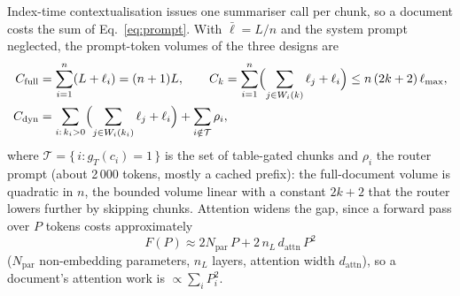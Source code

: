 \documentclass[pdflatex,sn-mathphys-num]{sn-jnl}
\theoremstyle{thmstyleone}%
\theoremstyle{thmstylethree}%
\begin{document}
Index-time contextualisation issues one summariser call per chunk, so a document costs the sum of Eq.~\eqref{eq:prompt}. With $\bar\ell=L/n$ and the system prompt neglected, the prompt-token volumes of the three designs are
\begin{align}
C_{\mathrm{full}}&=\sum_{i=1}^{n}(L+\ell_i)=(n+1)L,\qquad
C_{k}=\sum_{i=1}^{n}\Bigl(\sum_{j\in W_i(k)}\ell_j+\ell_i\Bigr)\le n\,(2k+2)\,\ell_{\max},\nonumber\\
C_{\mathrm{dyn}}&=\sum_{i:\,k_i>0}\Bigl(\sum_{j\in W_i(k_i)}\ell_j+\ell_i\Bigr)+\sum_{i\notin\mathcal T}\rho_i,\label{eq:volume}
\end{align}
where $\mathcal T=\{\,i: g_T(c_i)=1\,\}$ is the set of table-gated chunks and $\rho_i$ the router prompt (about 2\,000 tokens, mostly a cached prefix): the full-document volume is quadratic in $n$, the bounded volume linear with a constant $2k+2$ that the router lowers further by skipping chunks. Attention widens the gap, since a forward pass over $P$ tokens costs approximately \cite{kaplan2020scaling}
\begin{equation}\label{eq:flops}
F(P)\approx 2N_{\mathrm{par}}\,P+2\,n_L\,d_{\mathrm{attn}}\,P^{2}
\end{equation}
($N_{\mathrm{par}}$ non-embedding parameters, $n_L$ layers, attention width $d_{\mathrm{attn}}$), so a document's attention work is $\propto\sum_i P_i^2$.
\end{document}
